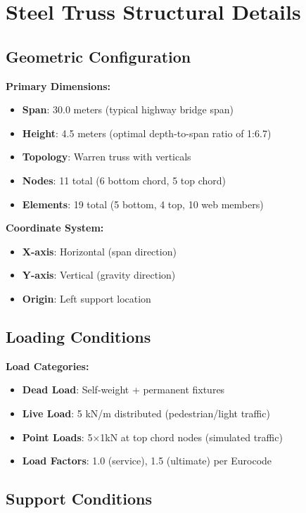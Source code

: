 \documentclass[12pt,a4paper]{article}
\begin{document}
\section{Steel Truss Structural Details}

\subsection{Geometric Configuration}

\textbf{Primary Dimensions:}
\begin{itemize}
    \item \textbf{Span}: 30.0 meters (typical highway bridge span)
    \item \textbf{Height}: 4.5 meters (optimal depth-to-span ratio of 1:6.7)
    \item \textbf{Topology}: Warren truss with verticals
    \item \textbf{Nodes}: 11 total (6 bottom chord, 5 top chord)
    \item \textbf{Elements}: 19 total (5 bottom, 4 top, 10 web members)
\end{itemize}

\textbf{Coordinate System:}
\begin{itemize}
    \item \textbf{X-axis}: Horizontal (span direction)
    \item \textbf{Y-axis}: Vertical (gravity direction)
    \item \textbf{Origin}: Left support location
\end{itemize}

\subsection{Loading Conditions}

\textbf{Load Categories:}
\begin{itemize}
    \item \textbf{Dead Load}: Self-weight + permanent fixtures
    \item \textbf{Live Load}: 5 kN/m distributed (pedestrian/light traffic)
    \item \textbf{Point Loads}: 5×1kN at top chord nodes (simulated traffic)
    \item \textbf{Load Factors}: 1.0 (service), 1.5 (ultimate) per Eurocode
\end{itemize}

\subsection{Support Conditions}
\end{document}
